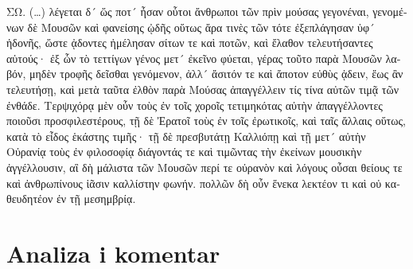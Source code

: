 {\large

\begin{greek}

\noindent ΣΩ. (\dots) λέγεται δ´ ὥς ποτ´ ἦσαν οὗτοι ἄνθρωποι τῶν πρὶν μούσας γεγονέναι, γενομένων δὲ Μουσῶν καὶ φανείσης ᾠδῆς οὕτως ἄρα τινὲς τῶν τότε ἐξεπλάγησαν ὑφ´ ἡδονῆς, ὥστε ᾀδοντες ἠμέλησαν σίτων τε καὶ ποτῶν, καὶ ἔλαθον τελευτήσαντες αὑτούς· ἐξ ὧν τὸ τεττίγων γένος μετ´ ἐκεῖνο φύεται, γέρας τοῦτο παρὰ Μουσῶν λαβόν, μηδὲν τροφῆς δεῖσθαι γενόμενον, ἀλλ´ ἄσιτόν τε καὶ ἄποτον εὐθὺς ᾀδειν, ἕως ἂν τελευτήσῃ, καὶ μετὰ ταῦτα ἐλθὸν παρὰ Μούσας ἀπαγγέλλειν τίς τίνα αὐτῶν τιμᾷ τῶν ἐνθάδε. Τερψιχόρᾳ μὲν οὖν τοὺς ἐν τοῖς χοροῖς τετιμηκότας αὐτὴν ἀπαγγέλλοντες ποιοῦσι προσφιλεστέρους, τῇ δὲ Ἐρατοῖ τοὺς ἐν τοῖς ἐρωτικοῖς, καὶ ταῖς ἄλλαις οὕτως, κατὰ τὸ εἶδος ἑκάστης τιμῆς· τῇ δὲ πρεσβυτάτῃ Καλλιόπῃ καὶ τῇ μετ´ αὐτὴν Οὐρανίᾳ τοὺς ἐν φιλοσοφίᾳ διάγοντάς τε καὶ τιμῶντας τὴν ἐκείνων μουσικὴν ἀγγέλλουσιν, αἳ δὴ μάλιστα τῶν Μουσῶν περί τε οὐρανὸν καὶ λόγους οὖσαι θείους τε καὶ ἀνθρωπίνους ἱᾶσιν καλλίστην φωνήν. πολλῶν δὴ οὖν ἕνεκα λεκτέον τι καὶ οὐ καθευδητέον ἐν τῇ μεσημβρίᾳ.
\end{greek}

}

\newpage

\section*{Analiza i komentar}


